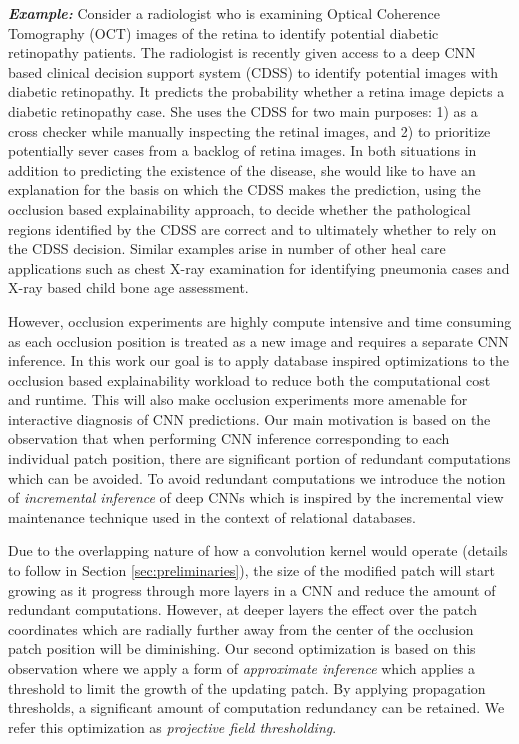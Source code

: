 \textbf{\textit{Example:}} Consider a radiologist who is examining Optical Coherence Tomography (OCT) images of the retina to identify potential diabetic retinopathy patients.
The radiologist is recently given access to a deep CNN based clinical decision support system (CDSS) to identify potential images with diabetic retinopathy. 
It predicts the probability whether a retina image depicts a diabetic retinopathy case.
She uses the CDSS for two main purposes: 1) as a cross checker while manually inspecting the retinal images, and 2) to prioritize potentially sever cases from a backlog of retina images.
In both situations in addition to predicting the existence of the disease, she would like to have an explanation for the basis on which the CDSS makes the prediction, using the occlusion based explainability approach, to decide whether the pathological regions identified by the CDSS are correct and to ultimately whether to rely on the CDSS decision. Similar examples arise in number of other heal care applications such as chest X-ray examination for identifying pneumonia cases and X-ray based child bone age assessment.

However, occlusion experiments are highly compute intensive and time consuming as each occlusion position is treated as a new image and requires a separate CNN inference.
In this work our goal is to apply database inspired optimizations to the occlusion based explainability workload to reduce both the computational cost and runtime.
This will also make occlusion experiments more amenable for interactive diagnosis of CNN predictions.
Our main motivation is based on the observation that when performing CNN inference corresponding to each individual patch position, there are significant portion of redundant computations which can be avoided.
To avoid redundant computations we introduce the notion of \textit{incremental inference} of deep CNNs which is inspired by the incremental view maintenance technique used in the context of relational databases.

Due to the overlapping nature of how a convolution kernel would operate (details to follow in Section \ref{sec:preliminaries}), the size of the modified patch will start growing as it progress through more layers in a CNN and reduce the amount of redundant computations.
However, at deeper layers the effect over the patch coordinates which are radially further away from the center of the occlusion patch position will be diminishing.
Our second optimization is based on this observation where we apply a form of \textit{approximate inference} which applies a threshold to limit the growth of the updating patch. 
By applying propagation thresholds, a significant amount of computation redundancy can be retained.
We refer this optimization as \textit{projective field thresholding}.

